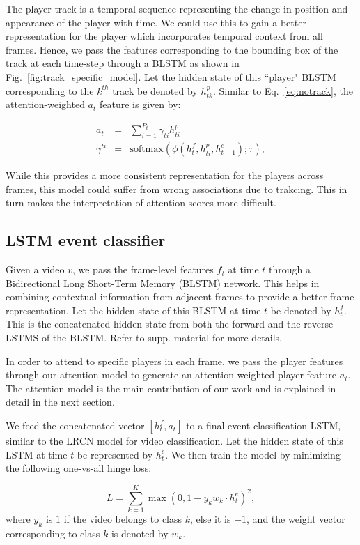 {The player-track is a temporal sequence representing the change in position and
appearance of the player with time.  We could use this to gain a better
representation for the player which incorporates temporal context from all
frames. Hence, we pass the features corresponding to the bounding box of the
track at each time-step through a BLSTM as shown in
Fig.~\ref{fig:track_specific_model}. Let the hidden state of this ``player"
BLSTM corresponding to the $k^{th}$ track be denoted by $h^p_{tk}$. Similar to
Eq.~\ref{eq:notrack}, the attention-weighted $a_t$ feature is given by:

\begin{eqnarray}
  a_t & = & \sum_{i=1}^{P_t} \gamma_{ti} h^p_{ti} \\ \nonumber
  \gamma^{ti} & = & \text{softmax} \left(\phi\left(h^f_t, h^p_{ti}, h^e_{t-1}\right); \tau\right),
\end{eqnarray}

While this provides a more consistent representation for the players across frames,
this model could suffer from wrong associations due to trakcing. This in turn makes
the interpretation of attention scores more difficult.


\subsection{LSTM event classifier}
Given a video $v$, we pass the frame-level features $f_t$ at time $t$ through a
Bidirectional Long Short-Term Memory (BLSTM) network. This helps in combining
contextual information from adjacent frames to provide a better frame
representation.  Let the hidden state of this BLSTM at time $t$ be denoted by
$h^f_t$.  This is the concatenated hidden state from both the forward and the
reverse LSTMS of the BLSTM. Refer to supp.  material for more details.

In order to attend to specific players in each frame, we pass the player features
through our attention model to generate an attention weighted player feature
$a_t$. The attention model is the main contribution of our work
and is explained in detail in the next section.

We feed the concatenated vector $[h^f_t, a_t]$ to a final event classification
LSTM, similar to the LRCN \cite{} model for video classification. Let
the hidden state of this LSTM at time $t$ be represented by $h^e_t$.  We then
train the model by minimizing the following one-vs-all hinge loss:

\begin{equation}
  L = \sum_{k = 1}^K \max (0, 1 - y_k w_k \cdot h^e_t)^2,
\end{equation} where $y_k$ is $1$ if the video belongs to class $k$,
else it is $-1$, and the weight vector corresponding to
class $k$ is denoted by $w_k$.
}
